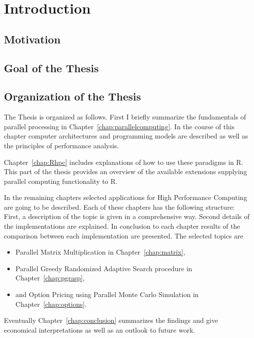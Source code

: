 \chapter{Introduction}
\section{Motivation}
\section{Goal of the Thesis}
\section{Organization of the Thesis}

The Thesis is organized as follows. First I briefly summarize the
fundamentals of parallel processing in
Chapter~\ref{chap:parallelcomputing}. In the course of this chapter
computer architectures and programming models are described as well as the
principles of performance analysis.

Chapter~\ref{chap:Rhpc} includes explanations of how to use these
paradigms in R. This part of
the thesis provides an overview of the
available extensions supplying parallel computing functionality to R.

In the remaining chapters selected applications for High Performance
Computing are going to be
described. Each of these chapters has the following structure: First,
a description of the topic is given in a comprehensive way. Second
details of the implementations are explained. In conclusion to each
chapter results of the comparison between each implementation are
presented. The selected topics are
\begin{itemize}
\item Parallel Matrix Multiplication in Chapter~\ref{chap:matrix},
\item Parallel Greedy Randomized Adaptive Search procedure in
  Chapter~\ref{chap:pgrasp},
\item and Option Pricing using Parallel Monte Carlo Simulation in
  Chapter~\ref{chap:options}. 
\end{itemize}
Eventually Chapter~\ref{chap:conclusion} summarizes
the findings and give economical interpretations as well as an outlook
to future work.
